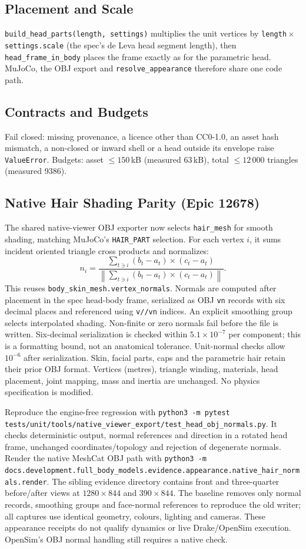 \subsection{Placement and Scale}
\texttt{build\_head\_parts(length, settings)} multiplies the unit vertices by
\texttt{length}\,$\times$\,\texttt{settings.scale} (the spec's de Leva head
segment length), then \texttt{head\_frame\_in\_body} places the frame exactly as
for the parametric head. MuJoCo, the OBJ export and \texttt{resolve\_appearance}
therefore share one code path.

\subsection{Contracts and Budgets}
Fail closed: missing provenance, a licence other than CC0-1.0, an asset hash
mismatch, a non-closed or inward shell or a head outside its envelope raise
\texttt{ValueError}. Budgets: asset $\le150$\,kB (measured 63\,kB), total
$\le12\,000$ triangles (measured 9386).

\subsection{Native Hair Shading Parity (Epic 12678)}
The shared native-viewer OBJ exporter now selects \texttt{hair\_mesh} for
smooth shading, matching MuJoCo's \texttt{HAIR\_PART} selection. For each
vertex $i$, it sums incident oriented triangle cross products and normalizes:
\[
 n_i = \frac{\sum_{t\ni i}(b_t-a_t)\times(c_t-a_t)}
 {\left\|\sum_{t\ni i}(b_t-a_t)\times(c_t-a_t)\right\|}.
\]
This reuses \texttt{body\_skin\_mesh.vertex\_normals}. Normals are computed
after placement in the spec head-body frame, serialized as OBJ \texttt{vn}
records with six decimal places and referenced using \texttt{v//vn} indices.
An explicit smoothing group selects interpolated shading. Non-finite or zero
normals fail before the file is written. Six-decimal serialization is checked
within $5.1\times10^{-7}$ per component; this is a formatting bound, not an
anatomical tolerance. Unit-normal checks allow $10^{-6}$ after serialization.
Skin, facial parts, caps and the parametric hair retain their prior OBJ format.
Vertices (metres), triangle winding, materials, head placement, joint mapping,
mass and inertia are unchanged. No physics specification is modified.

Reproduce the engine-free regression with
\texttt{python3 -m pytest tests/unit/tools/native\_viewer\_export/test\_head\_obj\_normals.py}.
It checks deterministic output, normal references and direction in a rotated
head frame, unchanged coordinates/topology and rejection of degenerate normals.
Render the native MeshCat OBJ path with
\texttt{python3 -m docs.development.full\_body\_models.evidence.appearance.native\_hair\_normals.render}.
The sibling evidence directory contains front and three-quarter before/after
views at $1280\times844$ and $390\times844$. The baseline removes only normal
records, smoothing groups and face-normal references to reproduce the old
writer; all captures use identical geometry, colours, lighting and cameras.
These appearance receipts do not qualify dynamics or live Drake/OpenSim
execution. OpenSim's OBJ normal handling still requires a native check.

